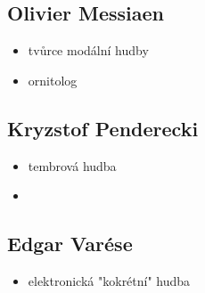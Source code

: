 \subsection{Olivier Messiaen}
\begin{itemize}
\item tvůrce modální hudby
\item ornitolog
\end{itemize}

\subsection{Kryzstof Penderecki}
\begin{itemize}
\item tembrová hudba
\item 
\end{itemize}

\subsection{Edgar Varése}
\begin{itemize}
\item elektronická "kokrétní" hudba
\end{itemize}


